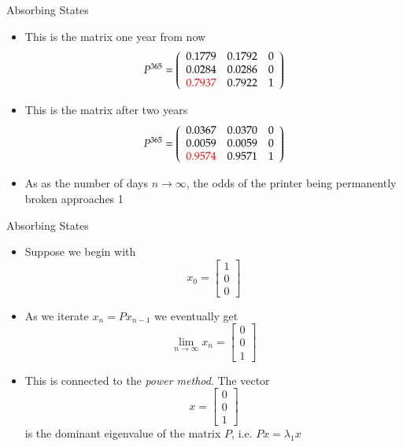 \documentclass[10pt]{beamer}
\begin{document}
\begin{frame}{Absorbing States}
\begin{itemize}

      \item This is the matrix one year from now
         $$P^{365} =
         \left(%
         \begin{array}{lll}
             0.1779 & 0.1792 & 0 \\
             0.0284 & 0.0286 & 0 \\
             \red{0.7937} & 0.7922 & 1
         \end{array}%
         \right)
         $$
          \item This is the matrix after two years 
         $$P^{365} =
         \left(%
         \begin{array}{lll}
             0.0367 & 0.0370 & 0 \\
             0.0059 & 0.0059 & 0 \\
             \red{0.9574} & 0.9571 & 1
         \end{array}%
         \right)
         $$
         \item As as the number of days $n\rightarrow \infty$, the odds of the printer being permanently broken approaches 1

\end{itemize}
\end{frame}

\begin{frame}{Absorbing States}
\begin{itemize}
      \item Suppose we begin with 
      $$x_0 = \begin{bmatrix}
          1\\0 \\0
      \end{bmatrix}$$

      \item As we iterate 
      $ x_n = P x_{n-1}$
      we eventually get 
      $$\lim_{n\rightarrow \infty} x_n = \begin{bmatrix}
          0\\0\\1
      \end{bmatrix}$$
    \item<2> This is connected to the \textit{power method}. The vector
    $$x=\begin{bmatrix}
        0\\0\\1
    \end{bmatrix}$$
    is the dominant eigenvalue of the matrix $P$, i.e. $Px = \lambda_1 x$
\end{itemize}
\end{frame}
\end{document}
